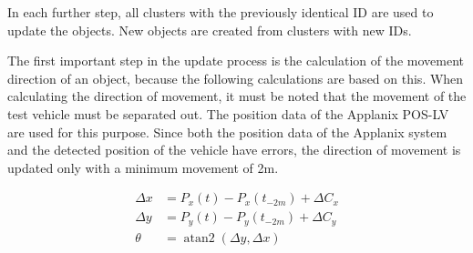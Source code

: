 \documentclass[11pt,oneside,openright]{mpreport}
\DeclareMathOperator{\atantwo}{atan2}
\begin{document}



In each further step, all clusters with the previously identical ID are used to update the objects. New objects are created from clusters with new IDs.

The first important step in the update process is the calculation of the movement direction of an object, because the following calculations are based on this.
When calculating the direction of movement, it must be noted that the movement of the test vehicle must be separated out. The position data of the Applanix POS-LV are used for this purpose.
Since both the position data of the Applanix system and the detected position of the vehicle have errors, the direction of movement is updated only with a minimum movement of 2m.

\begin{align*}
\Delta x &= P_x(t) - P_x(t_{-2m}) + \Delta C_x\\
\Delta y &= P_y(t) - P_y(t_{-2m}) + \Delta C_y\\
\theta &= \atantwo(\Delta y,\Delta x)
\end{align*}
\end{document}
